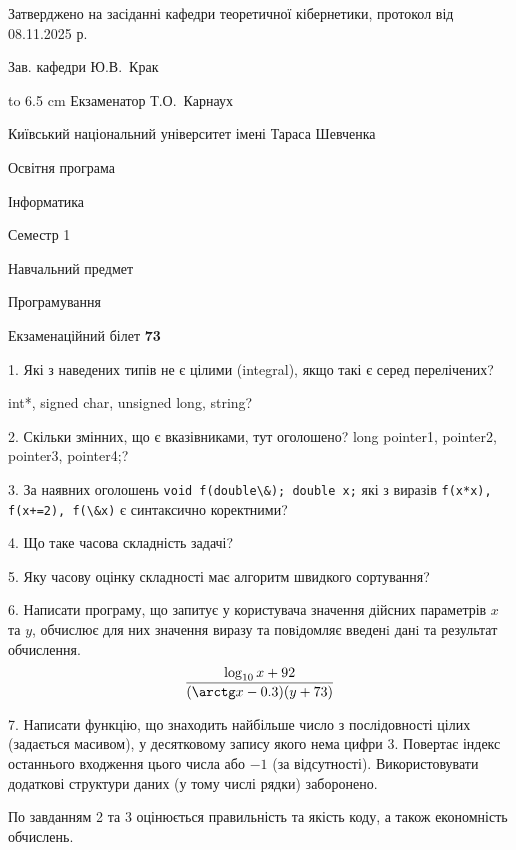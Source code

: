 \documentclass[12pt, ukrainian]{article}
\def\code#1{\Verb!#1!}
\begin{document}
{\smallskip\smallskip \begin {scriptsize} Затверджено на засіданні кафедри теоретичної кібернетики, протокол   від   08.11.2025 р.\par\smallskip\smallskip\smallskip\smallskip
{\parbox {6.5 cm} {Зав. кафедри \dotfill Ю.В.~Крак}}\hspace {0.7cm} {\hbox to 6.5 cm { Екзаменатор \dotfill Т.О.~Карнаух}} \end{scriptsize}}
\newpage
{{\begin {scriptsize}\par
{ \center  Київський національний університет імені Тараса Шевченка \par}
{\parbox {5 cm}{Освітня програма \hfill}{\parbox {7 cm}{Інформатика\hfill}}\parbox {6 cm}{\hfill Семестр 1}}\par
{\parbox {5 cm} {Навчальний предмет \hfill}\parbox {7 cm}{Програмування \hfill}\parbox {6cm}{\hfill}\par}\vspace{-15pt} \end{scriptsize}}{\center Екзаменаційний білет \No \textbf { 73 }\par}}
{%
1. Які з наведених типів не є цілими (integral), якщо такі є серед перелічених?

int*, signed char, unsigned long, string?
\par
\vspace{2mm}
2. Скільки змінних, що є вказівниками, тут оголошено?
long pointer1, pointer2, pointer3, pointer4;?
\par
\vspace{2mm}
3. За наявних оголошень \code{void f(double\&); double x;} які з виразів \code{f(x*x), f(x+=2), f(\&x)} є синтаксично коректними?
\par
\vspace{2mm}
4. Що таке часова складність задачі?
\par
\vspace{2mm}
5. Яку часову оцінку складності має алгоритм швидкого сортування?
\par
\vspace{2mm}
6. Написати програму, що запитує у користувача значення дійсних параметрів $x$ та $y$, обчислює для них значення виразу та повiдомляє введенi данi та результат обчислення.
$$\frac{\log_{10} x + 92}{(\arctg x - 0.3) (y + 73)}$$ 

\par
7. Написати функцію, що знаходить найбільше число з послідовності цілих (задається масивом), у десятковому запису якого нема цифри 3. Повертає індекс останнього входження цього числа або $-1$ (за відсутності). Використовувати додаткові структури даних (у тому числі рядки) заборонено.

По завданням 2 та 3 оцінюється правильність та якість коду, а також економність обчислень.

}
\end{document}

